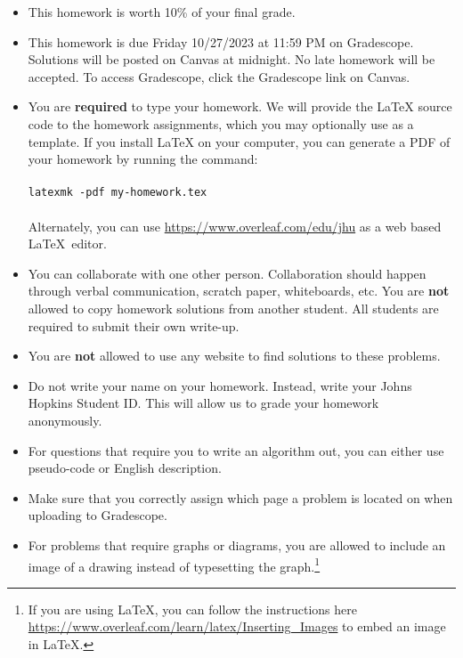 \documentclass[letter,11pt]{article}
\begin{document}
\begin{itemize}
\item This homework is worth 10\% of your final grade.

\item This homework is due Friday 10/27/2023 at 11:59 PM on
  Gradescope.  Solutions will be posted on Canvas at midnight.  No late homework will be accepted.  To access Gradescope, click the Gradescope link on Canvas.

\item You are \textbf{required} to type your homework.  We will
  provide the \LaTeX{} source code to the homework assignments, which you may
  optionally use as a template.  If you install \LaTeX{} on your computer, you can
  generate a PDF of
  your homework by running the command: \\
  \\
  \texttt{latexmk~-pdf~my-homework.tex} \\
  \\
  Alternately, you can use \url{https://www.overleaf.com/edu/jhu} as a web based
  \LaTeX~editor.

\item You can collaborate with one other person.
    Collaboration should happen through verbal communication, scratch paper,
    whiteboards, etc.  You are \textbf{not} allowed to copy homework
    solutions from another student.  All students are required to submit their
    own write-up.

\item You are \textbf{not} allowed to use any website to find solutions to these problems.

\item Do not write your name on your homework. Instead, write your Johns Hopkins Student ID.  This will allow us to grade your homework anonymously.

\item For questions that require you to write an algorithm out, you can either use pseudo-code or English description.

\item Make sure that you correctly assign which page a problem is located on when uploading to Gradescope.

\item For problems that require graphs or diagrams, you are allowed to include an image of a drawing instead of typesetting the graph.\footnote{If you are using LaTeX, you can follow the instructions here \url{https://www.overleaf.com/learn/latex/Inserting_Images} to embed an image in LaTeX.}
\end{itemize}
\end{document}
